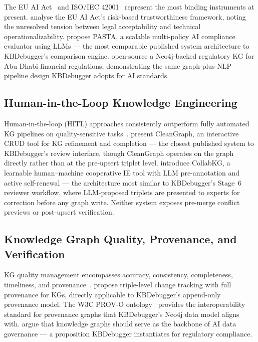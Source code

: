 The EU AI Act~\citep{euAIAct2024} and ISO/IEC 42001~\citep{iso42001} represent the most
binding instruments at present. \citet{laux2022trustworthy} analyse the EU AI Act's
risk-based trustworthiness framework, noting the unresolved tension between legal
acceptability and technical operationalizability. \citet{yang2026pasta} propose PASTA, a
scalable multi-policy AI compliance evaluator using LLMs — the most comparable published
system architecture to KBDebugger's comparison engine. \citet{ershov2023compliance}
open-source a Neo4j-backed regulatory KG for Abu Dhabi financial regulations, demonstrating
the same graph-plus-NLP pipeline design KBDebugger adopts for AI standards.

\subsection{Human-in-the-Loop Knowledge Engineering}

Human-in-the-loop (HITL) approaches consistently outperform fully automated KG pipelines
on quality-sensitive tasks~\citep{mosqueira2023hitl}.
\citet{bikaun2024cleangraph} present CleanGraph, an interactive CRUD tool for KG refinement
and completion — the closest published system to KBDebugger's review interface, though
CleanGraph operates on the graph directly rather than at the pre-upsert triplet level.
\citet{tang2024collabkg} introduce CollabKG, a learnable human--machine cooperative IE tool
with LLM pre-annotation and active self-renewal — the architecture most similar to
KBDebugger's Stage~6 reviewer workflow, where LLM-proposed triplets are presented to experts
for correction before any graph write. Neither system exposes pre-merge conflict previews or
post-upsert verification.

\subsection{Knowledge Graph Quality, Provenance, and Verification}

KG quality management encompasses accuracy, consistency, completeness, timeliness, and
provenance~\citep{xue2023kgquality,zaveri2016quality}.
\citet{dibowski2024provenance} propose triple-level change tracking with full provenance for
KGs, directly applicable to KBDebugger's append-only provenance model.
The W3C PROV-O ontology~\citep{w3cprov2013} provides the interoperability standard for
provenance graphs that KBDebugger's Neo4j data model aligns with.
\citet{merono2025kg} argue that knowledge graphs should serve as the backbone of AI data
governance — a proposition KBDebugger instantiates for regulatory compliance.

